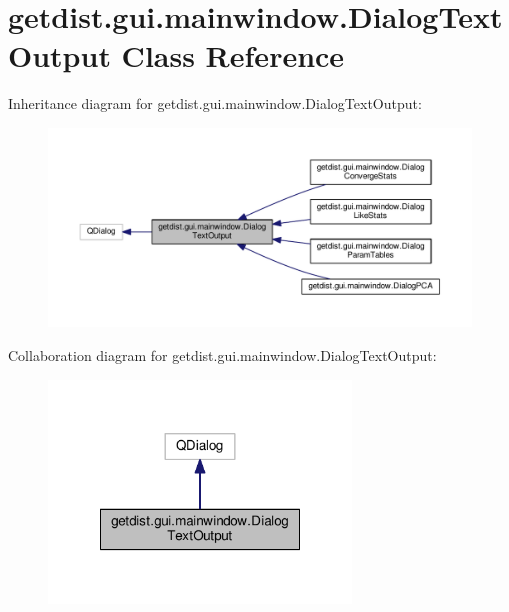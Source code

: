 \hypertarget{classgetdist_1_1gui_1_1mainwindow_1_1DialogTextOutput}{}\section{getdist.\+gui.\+mainwindow.\+Dialog\+Text\+Output Class Reference}
\label{classgetdist_1_1gui_1_1mainwindow_1_1DialogTextOutput}


Inheritance diagram for getdist.\+gui.\+mainwindow.\+Dialog\+Text\+Output\+:
\nopagebreak
\begin{figure}[H]
\begin{center}
\leavevmode
\includegraphics[width=350pt]{classgetdist_1_1gui_1_1mainwindow_1_1DialogTextOutput__inherit__graph}
\end{center}
\end{figure}


Collaboration diagram for getdist.\+gui.\+mainwindow.\+Dialog\+Text\+Output\+:
\nopagebreak
\begin{figure}[H]
\begin{center}
\leavevmode
\includegraphics[width=228pt]{classgetdist_1_1gui_1_1mainwindow_1_1DialogTextOutput__coll__graph}
\end{center}
\end{figure}
